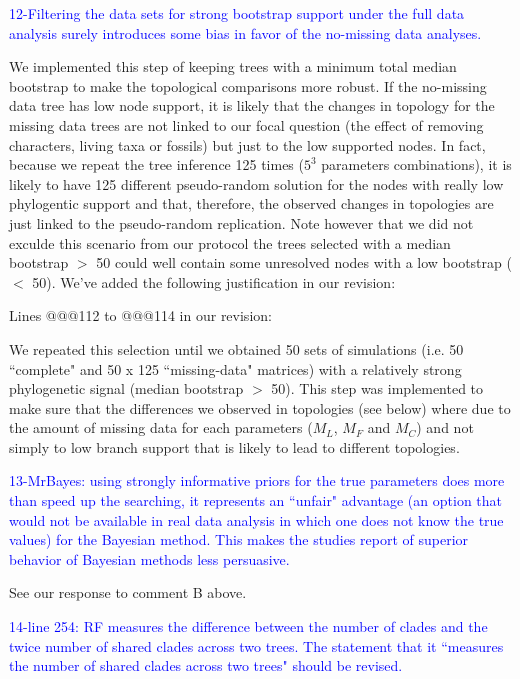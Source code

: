 \documentclass[11pt]{letter}
\begin{document}
\begin{letter}{}

\textcolor{blue}{12-Filtering the data sets for strong bootstrap support under the full data analysis surely introduces some bias in favor of the no-missing data analyses.}

We implemented this step of keeping trees with a minimum total median bootstrap to make the topological comparisons more robust. If the no-missing data tree has low node support, it is likely that the changes in topology for the missing data trees are not linked to our focal question (the effect of removing characters, living taxa or fossils) but just to the low supported nodes. In fact, because we repeat the tree inference 125 times ($5^3$ parameters combinations), it is likely to have 125 different pseudo-random solution for the nodes with really low phylogentic support and that, therefore, the observed changes in topologies are just linked to the pseudo-random replication. Note however that we did not exculde this scenario from our protocol the trees selected with a median bootstrap $>$ 50 could well contain some unresolved nodes with a low bootstrap ($<$ 50). We've added the following justification in our revision:

Lines @@@112 to @@@114 in our revision:

\hfill\begin{minipage}{\dimexpr\textwidth-1cm}
We repeated this selection until we obtained 50 sets of simulations (i.e. 50 ``complete" and 50 x 125 ``missing-data" matrices) with a relatively strong phylogenetic signal (median bootstrap $>$ 50). This step was implemented to make sure that the differences we observed in topologies (see below) where due to the amount of missing data for each parameters ($M_L$, $M_F$ and $M_C$) and not simply to low branch support that is likely to lead to different topologies.
\end{minipage}


\textcolor{blue}{13-MrBayes: using strongly informative priors for the true parameters does more than speed up the searching, it represents an ``unfair" advantage (an option that would not be available in real data analysis in which one does not know the true values) for the Bayesian method. This makes the studies report of superior behavior of Bayesian methods less persuasive.}

See our response to comment B above.


\textcolor{blue}{14-line 254: RF measures the difference between the number of clades and the twice number of shared clades across two trees. The statement that it ``measures the number of shared clades across two trees" should be revised.}


\end{letter}
\end{document}
